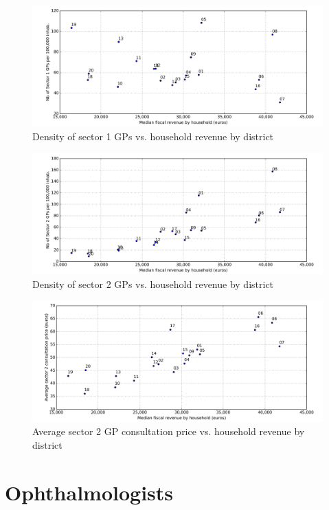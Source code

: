 \documentclass[11pt]{article}
\begin{document}
\begin{figure}[H]
    \caption{Density of sector 1 GPs vs. household revenue by district}
	\centering
		\includegraphics[width=16cm]{images/GP_Ardt_DensityS1VsRevenue.png}
\end{figure}

\begin{figure}[H]
    \caption{Density of sector 2 GPs vs. household revenue by district}
	\centering
		\includegraphics[width=16cm]{images/GP_Ardt_DensityS2VsRevenue.png}
\end{figure}

\begin{figure}[H]
    \caption{Average sector 2 GP consultation price vs. household revenue by district}
	\centering
		\includegraphics[width=16cm]{images/GP_Ardt_ConsultationS2VsRevenue.png}
\end{figure}

\section{Ophthalmologists}
\end{document}
